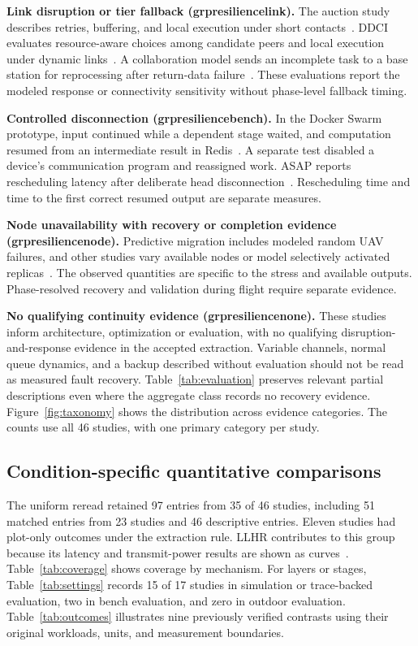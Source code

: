 \documentclass[pdflatex,sn-vancouver-num]{sn-jnl}
\newcommand{\groupcite}[2]{\csname grp#1#2\endcsname}
\begin{document}
\textbf{Link disruption or tier fallback (\groupcite{resilience}{link}).}
The auction study describes retries, buffering, and local execution under short contacts~\cite{R0058}. DDCI evaluates resource-aware choices among candidate peers and local execution under dynamic links~\cite{R0092}. A collaboration model sends an incomplete task to a base station for reprocessing after return-data failure~\cite{R0044}. These evaluations report the modeled response or connectivity sensitivity without phase-level fallback timing.

\textbf{Controlled disconnection (\groupcite{resilience}{bench}).}
In the Docker Swarm prototype, input continued while a dependent stage waited, and computation resumed from an intermediate result in Redis~\cite{R0038}. A separate test disabled a device's communication program and reassigned work. ASAP reports rescheduling latency after deliberate head disconnection~\cite{R0062,R0014}. Rescheduling time and time to the first correct resumed output are separate measures.

\textbf{Node unavailability with recovery or completion evidence (\groupcite{resilience}{node}).}
Predictive migration includes modeled random UAV failures, and other studies vary available nodes or model selectively activated replicas~\cite{R0002,R0073,R0106,R0110}. The observed quantities are specific to the stress and available outputs. Phase-resolved recovery and validation during flight require separate evidence.

\textbf{No qualifying continuity evidence (\groupcite{resilience}{none}).}
These studies inform architecture, optimization or evaluation, with no qualifying disruption-and-response evidence in the accepted extraction. Variable channels, normal queue dynamics, and a backup described without evaluation should not be read as measured fault recovery. Table~\ref{tab:evaluation} preserves relevant partial descriptions even where the aggregate class records no recovery evidence. Figure~\ref{fig:taxonomy} shows the distribution across evidence categories. The counts use all 46 studies, with one primary category per study.
\FloatBarrier

\subsection{Condition-specific quantitative comparisons}
The uniform reread retained 97 entries from 35 of 46 studies, including 51 matched entries from 23 studies and 46 descriptive entries. Eleven studies had plot-only outcomes under the extraction rule. LLHR contributes to this group because its latency and transmit-power results are shown as curves~\cite{R0082}. Table~\ref{tab:coverage} shows coverage by mechanism. For layers or stages, Table~\ref{tab:settings} records 15 of 17 studies in simulation or trace-backed evaluation, two in bench evaluation, and zero in outdoor evaluation. Table~\ref{tab:outcomes} illustrates nine previously verified contrasts using their original workloads, units, and measurement boundaries.
\end{document}
